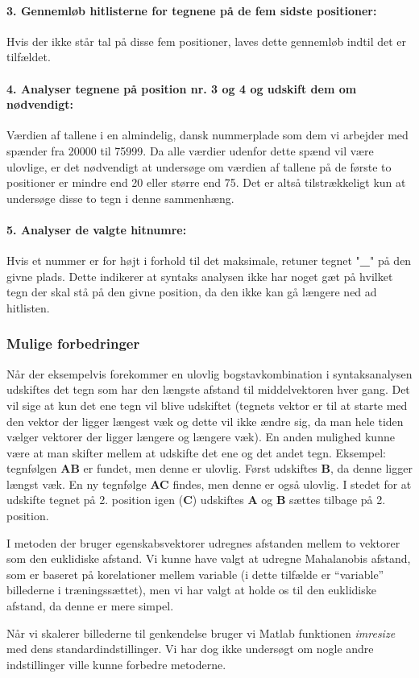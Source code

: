 \paragraph{3. Gennemløb hitlisterne for tegnene på de fem sidste positioner:} Hvis der ikke står tal på disse fem positioner, laves dette gennemløb indtil det er tilfældet.

\paragraph{4. Analyser tegnene på position nr. 3 og 4 og udskift dem om nødvendigt:}
Værdien af tallene i en almindelig, dansk nummerplade som dem vi arbejder med spænder fra 20000 til 75999. Da alle værdier udenfor dette spænd vil være ulovlige, er det nødvendigt at undersøge om værdien af tallene på de første to positioner er mindre end 20 eller større end 75. Det er altså tilstrækkeligt kun at undersøge disse to tegn i denne sammenhæng.

\paragraph{5. Analyser de valgte hitnumre:} Hvis et nummer er for højt i forhold til det maksimale, retuner tegnet "\textbf{\_}" på den givne plads. Dette indikerer at syntaks analysen ikke har noget gæt på hvilket tegn der skal stå på den givne position, da den ikke kan gå længere ned ad hitlisten.

\subsubsection{Mulige forbedringer}
Når der eksempelvis forekommer en ulovlig bogstavkombination i syntaksanalysen udskiftes det tegn som har den længste afstand til middelvektoren hver gang. Det vil sige at kun det ene tegn vil blive udskiftet (tegnets vektor er til at starte med den vektor der ligger længest væk og dette vil ikke ændre sig, da man hele tiden vælger vektorer der ligger længere og længere væk). En anden mulighed kunne være at man skifter mellem at udskifte det ene og det andet tegn. Eksempel: tegnfølgen \textbf{AB} er fundet, men denne er ulovlig. Først udskiftes \textbf{B}, da denne ligger længst væk. En ny tegnfølge \textbf{AC} findes, men denne er også ulovlig. I stedet for at udskifte tegnet på 2. position igen (\textbf{C}) udskiftes \textbf{A} og \textbf{B} sættes tilbage på 2. position.

I metoden der bruger egenskabsvektorer udregnes afstanden mellem to vektorer som den euklidiske afstand. Vi kunne have valgt at udregne Mahalanobis afstand, som er baseret på korelationer mellem variable (i dette tilfælde er ``variable'' billederne i træningssættet), men vi har valgt at holde os til den euklidiske afstand, da denne er mere simpel.

Når vi skalerer billederne til genkendelse bruger vi Matlab funktionen \textit{imresize} med dens standardindstillinger. Vi har dog ikke undersøgt om nogle andre indstillinger ville kunne forbedre metoderne.